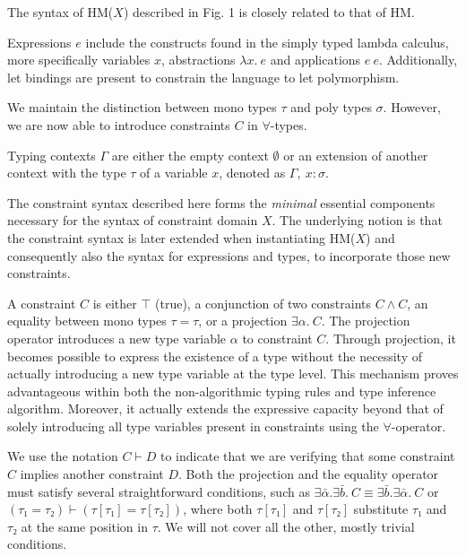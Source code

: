 \documentclass[runningheads]{llncs}
\newcommand{\hmx}{HM($X$)}
\begin{document}
The syntax of \hmx{} described in Fig. 1 is closely related to that of HM.

Expressions $e$ include the constructs found in the simply typed lambda
calculus, more specifically variables $x$, abstractions $λx. \ e$ and
applications $e \
  e$.
Additionally, let bindings are present to constrain the language to let
polymorphism.

We maintain the distinction between mono types $τ$ and
poly types $σ$. However, we are now
able to introduce constraints $C$ in $∀$-types.

Typing contexts $Γ$ are either the empty context $∅$ or an extension of
another
context with the type $τ$ of a variable $x$, denoted as $Γ, \ x : σ$.

The constraint syntax described here forms the \emph{minimal} essential
components necessary for the syntax of constraint domain $X$.
The underlying notion is that the constraint syntax is later extended when
instantiating \hmx{} and
consequently also the syntax for expressions and types, to incorporate
those
new
constraints.

A constraint $C$ is either $⊤$ (true), a conjunction of two constraints
$C ∧ C$, an equality between mono types $τ = τ$, or a projection $∃α. \ C$.
The projection operator introduces a new type variable $α$ to constraint
$C$.
Through projection, it becomes possible to express the
existence of a type without the necessity of actually introducing a new
type variable at the type level.
This mechanism proves advantageous within both the non-algorithmic typing
rules and type inference algorithm.
Moreover, it actually extends the expressive capacity beyond that of
solely introducing all type variables present in constraints using
the $∀$-operator.

We use the notation $C ⊢ D$ to indicate that we are verifying that some
constraint $C$ implies another constraint $D$.
Both the projection and the equality operator must satisfy several
straightforward conditions, such as $∃\bar{α}.∃\bar{b}. \ C ≡
  ∃\bar{b}.∃\bar{α}. \ C$ or $(τ₁ = τ₂) ⊢ (τ[τ₁]
  = τ[τ₂])$, where both $τ[τ₁]$ and $τ[τ₂]$ substitute $τ₁$ and $τ₂$ at the
same
position in $τ$. We will not cover all the other, mostly trivial conditions.
\end{document}
